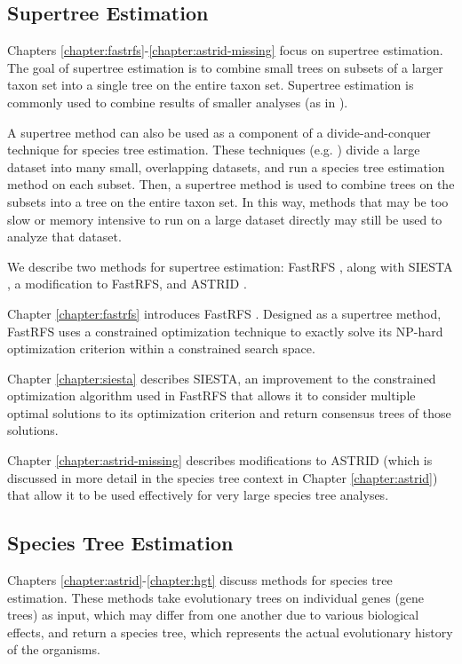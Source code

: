 \documentclass[tocnosub,noragright,centerchapter,fullpagesingle,12pt]{uiuc_csthesis18}
\begin{document}
\subsection*{Supertree Estimation}

Chapters \ref{chapter:fastrfs}-\ref{chapter:astrid-missing} focus on supertree estimation. The goal of
supertree estimation is to combine small trees on subsets of a larger
taxon set into a single tree on the entire taxon set. Supertree
estimation is commonly used to combine results of smaller analyses (as
in \cite{kennedy2002seabird,cpl,THPL,marsupial,placental}).

A supertree method can also be used as a component of a
divide-and-conquer technique for species tree estimation. These
techniques (e.g. \cite{dactal}) divide a large dataset into many small, overlapping
datasets, and run a species tree estimation method on each
subset. Then, a supertree method is used to combine trees on the
subsets into a tree on the entire taxon set. In this way, methods that
may be too slow or memory intensive to run on a large dataset directly
may still be used to analyze that dataset.

We describe two methods for supertree estimation: FastRFS \cite{vachaspati2017fastrfs}, along with SIESTA \cite{vachaspati2018siesta}, a modification to FastRFS, and ASTRID \cite{vachaspati2015astrid}.

Chapter \ref{chapter:fastrfs} introduces FastRFS
\cite{fastrfs}. Designed as a supertree method, FastRFS uses a
constrained optimization technique to exactly solve its NP-hard
optimization criterion within a constrained search space.

Chapter \ref{chapter:siesta} describes SIESTA, an improvement to the
constrained optimization algorithm used in FastRFS that allows it to
consider multiple optimal solutions to its optimization criterion and
return consensus trees of those solutions.

Chapter \ref{chapter:astrid-missing} describes modifications to ASTRID
(which is discussed in more detail in the species tree context in
Chapter \ref{chapter:astrid}) that allow it to be used effectively for
very large species tree analyses.

\subsection*{Species Tree Estimation}

Chapters \ref{chapter:astrid}-\ref{chapter:hgt} discuss methods for species tree
estimation. These methods take evolutionary trees on individual genes
(gene trees) as input, which may differ from one another due to
various biological effects, and return a species tree, which
represents the actual evolutionary history of the organisms.
\end{document}

